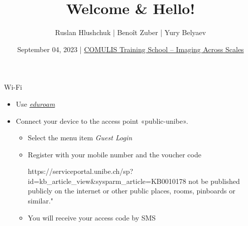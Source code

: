 \documentclass[aspectratio=169]{beamer}
\title{Welcome \& Hello!}
\author{Ruslan Hlushchuk | Benoît Zuber | Yury Belyaev}
\institute{Institute of Anatomy\\University of Bern\\Switzerland}
\date{September 04, 2023 |
\href{https://www.ana.unibe.ch/continuing_education/comulis_training_school/}
{COMULIS Training School -- Imaging Across Scales}}
\begin{document}
{%
	\begin{frame}%
		\maketitle
	\end{frame}%
}

\begin{frame}{Wi-Fi}
	\begin{itemize}
		\item Use \emph{\href{https://www.eduroam.org/}{eduroam}}
		\item Connect your device to the access point «public-unibe».
		\begin{itemize}
			\item Select the menu item \emph{Guest Login}
			\item Register with your mobile number and the voucher code
		
\begin{tcolorbox}[width=3.3cm,colframe=ubRed,colback=ubGrey,halign=center
,halign title=center,title=Voucher code]
https://serviceportal.unibe.ch/sp?id=kb_article_view&sysparm_article=KB0010178
not be published publicly on the internet or other public places, rooms,
pinboards or similar."
				
			\end{tcolorbox}
			\item You will receive your access code by SMS
		\end{itemize}
	\end{itemize}
\end{frame}
\end{document}
